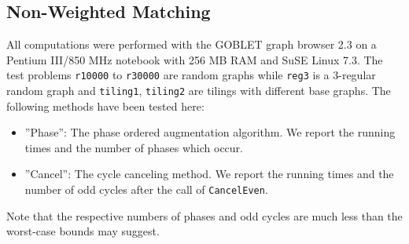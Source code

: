 \documentclass[a4paper,11pt,twoside]{book}
\begin{document}
\begin{multicols}{2}
\section{Non-Weighted Matching}
All computations were performed with the GOBLET graph browser 2.3 on a Pentium
III/850 MHz notebook with 256 MB RAM and SuSE Linux 7.3. The test problems
\verb/r10000/ to \verb/r30000/ are random graphs while \verb/reg3/ is a
$3$-regular random graph and \verb/tiling1/, \verb/tiling2/ are tilings with
different base graphs. The following methods have been tested here:
\begin{itemize}
\item ''Phase'': The phase ordered augmentation algorithm. We report the
    running times and the number of phases which occur.
\item ''Cancel'': The cycle canceling method. We report the running times and
    the number of odd cycles after the call of \verb/CancelEven/.
\end{itemize}
Note that the respective numbers of phases and odd cycles are much less than the
worst-case bounds may suggest.


\end{multicols}
\end{document}
